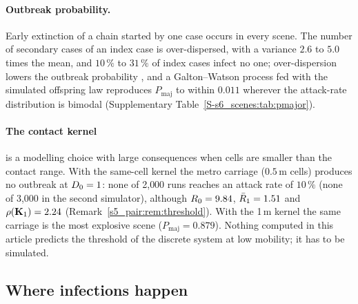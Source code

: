 \paragraph{Outbreak probability.} Early extinction of a chain started by one case occurs in every scene. The
number of secondary cases of an index case is over-dispersed, with a variance $2.6$ to $5.0$ times the mean,
and $10\,\%$ to $31\,\%$ of index cases infect no one; over-dispersion lowers the outbreak probability
\citep{lloydsmith2005superspreading}, and a Galton--Watson process fed with the simulated offspring law
reproduces $P_{\mathrm{maj}}$ to within $0.011$ wherever the attack-rate distribution is bimodal (Supplementary
Table~\ref{S-s6_scenes:tab:pmajor}).

\paragraph{The contact kernel} is a modelling choice with large consequences when cells are smaller than the
contact range. With the same-cell kernel the metro carriage ($0.5$\,m cells) produces no outbreak at $D_0=1$:
none of 2{,}000 runs reaches an attack rate of $10\,\%$ (none of 3{,}000 in the second simulator), although
$R_0=9.84$, $\bar{R}_1=1.51$ and $\rho(\mathbf{K}_1)=2.24$ (Remark~\ref{s5_pair:rem:threshold}). With the 1\,m kernel
the same carriage is the most explosive scene ($P_{\mathrm{maj}}=0.879$). Nothing computed in this article
predicts the threshold of the discrete system at low mobility; it has to be simulated.

\subsection{Where infections happen}\label{s6_scenes:sec:hotspot}

